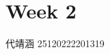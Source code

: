 \documentclass[../main.tex]{subfiles}
\begin{document}
\chapter{ Week 2 }

代靖涵 25120222201319
\end{document}
